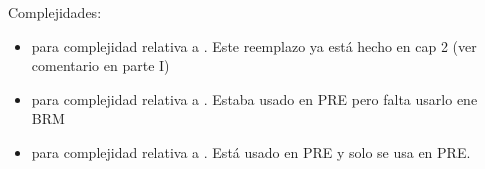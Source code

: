 \documentclass[a4paper,12pt,oneside]{book}
\begin{document}
Complejidades:

\begin{itemize}
\item \mdlbin para complejidad relativa a \grambin . Este reemplazo ya está hecho en cap 2 (ver comentario en parte I)

\item \mdl{\grambool} para complejidad relativa a \grambool. Estaba usado en PRE pero falta usarlo ene BRM

\item \mdl{\gramboolxor} para complejidad relativa a \gramboolxor. Está usado en PRE y solo se usa en PRE.
\end{itemize}


    
\restoregeometry 

    
    
    
    
\tableofcontents


\setlength{\parskip}{0.5em}

        
    
\end{document}
